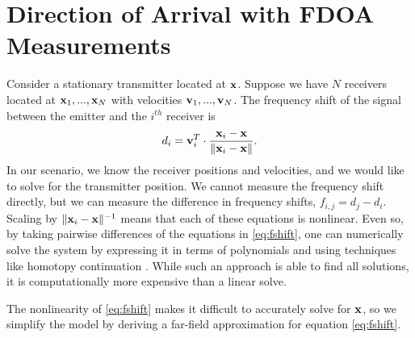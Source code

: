\section{Direction of Arrival with FDOA Measurements}
\label{s:FDOA}

Consider a stationary transmitter located at $\mathbf{x}$. Suppose we have $N$ receivers located at $\mathbf{x}_1, ...,\mathbf{x}_N$ with velocities $\mathbf{v}_1, ...,\mathbf{v}_N$. The frequency shift of the signal between the emitter and the $i^{th}$ receiver is
\begin{align}
  \label{eq:fshift}
  d_i =  \mathbf{v}_i^T\cdot\frac{\mathbf{x}_i-\mathbf{x}}{\|\mathbf{x}_i-\mathbf{x}\|}.
\end{align}
In our scenario, we know the receiver positions and velocities, and we would like to solve for the transmitter position. We cannot measure the frequency shift directly, but we can measure the difference in frequency shifts,
$f_{i,j} = d_j-d_i$. Scaling by $\|\mathbf{x}_i-\mathbf{x}\|^{-1}$ means that each of these equations is nonlinear. Even so, by taking pairwise differences of the equations in \eqref{eq:fshift}, one can numerically solve the system by expressing it in terms of polynomials and using techniques like homotopy continuation \cite{Cameron}. While such an approach is able to find all solutions, it is computationally more expensive than a linear solve.  

The nonlinearity of \ref{eq:fshift} makes it difficult to accurately solve for $\mathbf{x}$, so we simplify the model by deriving a far-field approximation for equation \ref{eq:fshift}.

